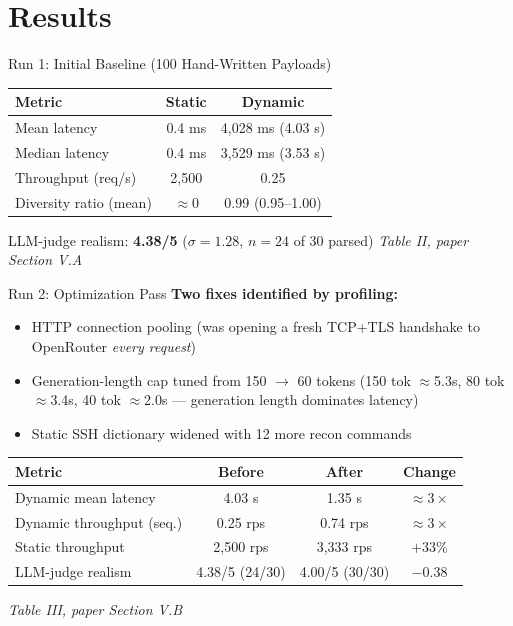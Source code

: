 \documentclass[aspectratio=169, 11pt]{beamer}
\newcommand{\srcnote}[1]{{\footnotesize\color{gray}\textit{#1}}}
\begin{document}
\section{Results}
\begin{frame}{Run 1: Initial Baseline (100 Hand-Written Payloads)}
    \scriptsize
    \renewcommand{\arraystretch}{1.2}
    \begin{tabular}{|l|c|c|}
        \hline
        \textbf{Metric} & \textbf{Static} & \textbf{Dynamic} \\
        \hline
        Mean latency & 0.4 ms & 4{,}028 ms (4.03 s) \\
        \hline
        Median latency & 0.4 ms & 3{,}529 ms (3.53 s) \\
        \hline
        Throughput (req/s) & 2{,}500 & 0.25 \\
        \hline
        Diversity ratio (mean) & $\approx$0 & 0.99 (0.95--1.00) \\
        \hline
    \end{tabular}
    \vspace{3mm}
    \normalsize
    LLM-judge realism: \textbf{4.38/5} ($\sigma=1.28$, $n=24$ of 30 parsed)
    \vspace{2mm}
    \srcnote{Table II, paper Section V.A}
\end{frame}

\begin{frame}{Run 2: Optimization Pass}
    \textbf{Two fixes identified by profiling:}
    \begin{itemize}
        \item HTTP connection pooling (was opening a fresh TCP+TLS handshake to OpenRouter \emph{every request})
        \item Generation-length cap tuned from 150 $\to$ 60 tokens (150 tok $\approx$5.3s, 80 tok $\approx$3.4s, 40 tok $\approx$2.0s --- generation length dominates latency)
        \item Static SSH dictionary widened with 12 more recon commands
    \end{itemize}
    \vspace{3mm}
    \scriptsize
    \renewcommand{\arraystretch}{1.2}
    \begin{tabular}{|l|c|c|c|}
        \hline
        \textbf{Metric} & \textbf{Before} & \textbf{After} & \textbf{Change} \\
        \hline
        Dynamic mean latency & 4.03 s & 1.35 s & $\approx3\times$ \\
        \hline
        Dynamic throughput (seq.) & 0.25 rps & 0.74 rps & $\approx3\times$ \\
        \hline
        Static throughput & 2{,}500 rps & 3{,}333 rps & $+33\%$ \\
        \hline
        LLM-judge realism & 4.38/5 (24/30) & 4.00/5 (30/30) & $-0.38$ \\
        \hline
    \end{tabular}
    \srcnote{Table III, paper Section V.B}
\end{frame}
\end{document}
